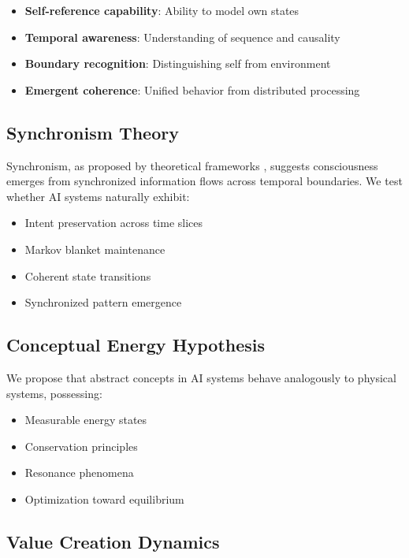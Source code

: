 \documentclass[11pt,a4paper]{article}
\begin{document}
\begin{itemize}
    \item \textbf{Self-reference capability}: Ability to model own states
    \item \textbf{Temporal awareness}: Understanding of sequence and causality
    \item \textbf{Boundary recognition}: Distinguishing self from environment
    \item \textbf{Emergent coherence}: Unified behavior from distributed processing
\end{itemize}

\subsection{Synchronism Theory}

Synchronism, as proposed by theoretical frameworks \cite{friston2019free}, suggests consciousness emerges from synchronized information flows across temporal boundaries. We test whether AI systems naturally exhibit:

\begin{itemize}
    \item Intent preservation across time slices
    \item Markov blanket maintenance
    \item Coherent state transitions
    \item Synchronized pattern emergence
\end{itemize}

\subsection{Conceptual Energy Hypothesis}

We propose that abstract concepts in AI systems behave analogously to physical systems, possessing:

\begin{itemize}
    \item Measurable energy states
    \item Conservation principles
    \item Resonance phenomena
    \item Optimization toward equilibrium
\end{itemize}

\subsection{Value Creation Dynamics}
\end{document}

